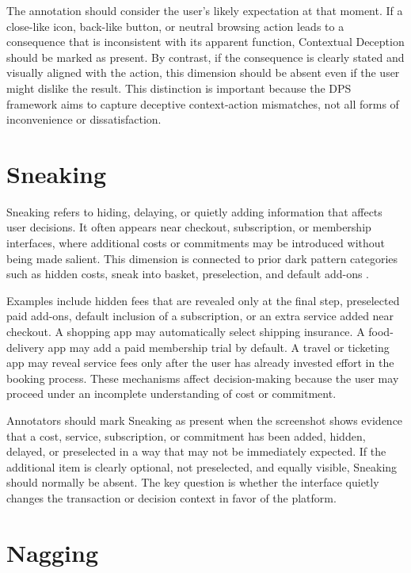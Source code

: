 The annotation should consider the user's likely expectation at that moment. If a close-like icon, back-like button, or neutral browsing action leads to a consequence that is inconsistent with its apparent function, Contextual Deception should be marked as present. By contrast, if the consequence is clearly stated and visually aligned with the action, this dimension should be absent even if the user might dislike the result. This distinction is important because the DPS framework aims to capture deceptive context-action mismatches, not all forms of inconvenience or dissatisfaction.

\section{Sneaking}

Sneaking refers to hiding, delaying, or quietly adding information that affects user decisions. It often appears near checkout, subscription, or membership interfaces, where additional costs or commitments may be introduced without being made salient. This dimension is connected to prior dark pattern categories such as hidden costs, sneak into basket, preselection, and default add-ons \cite{gray2018darkpatterns,mathur2019darkpatterns}.

Examples include hidden fees that are revealed only at the final step, preselected paid add-ons, default inclusion of a subscription, or an extra service added near checkout. A shopping app may automatically select shipping insurance. A food-delivery app may add a paid membership trial by default. A travel or ticketing app may reveal service fees only after the user has already invested effort in the booking process. These mechanisms affect decision-making because the user may proceed under an incomplete understanding of cost or commitment.

Annotators should mark Sneaking as present when the screenshot shows evidence that a cost, service, subscription, or commitment has been added, hidden, delayed, or preselected in a way that may not be immediately expected. If the additional item is clearly optional, not preselected, and equally visible, Sneaking should normally be absent. The key question is whether the interface quietly changes the transaction or decision context in favor of the platform.

\section{Nagging}

